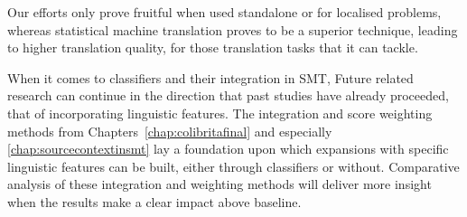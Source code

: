 Our efforts only prove fruitful when used standalone or for localised problems,
whereas statistical machine translation proves to be a superior technique,
leading to higher translation quality, for those translation tasks that it can
tackle.

When it comes to classifiers and their integration in SMT, Future related
research can continue in the direction that past studies have already
proceeded, that of incorporating linguistic features. The integration and score
weighting methods from Chapters~\ref{chap:colibritafinal} and especially
\ref{chap:sourcecontextinsmt} lay a foundation upon which expansions with
specific linguistic features can be built, either through classifiers or
without.  Comparative analysis of these integration and weighting methods will
deliver more insight when the results make a clear impact above baseline. 




